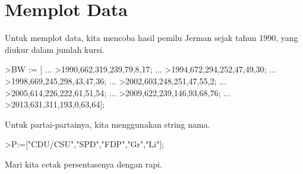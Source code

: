 \documentclass[a4paper,11pt,oneside,enabledeprecatedfontcommands]{scrbook}
\newenvironment{eulernotebook}{}{}
\newcommand{\eulerheading}[1]{\chapter{#1}}
\newenvironment{eulercomment}{\par\medskip\noindent}{\par\medskip}
\begin{document}
\begin{eulernotebook}
		\eulerheading{Memplot Data}
		\begin{eulercomment}
			Untuk memplot data, kita mencoba hasil pemilu Jerman sejak tahun 1990, yang diukur dalam jumlah
			kursi.
		\end{eulercomment}
		\begin{eulerprompt}
			>BW := [ ...
			>1990,662,319,239,79,8,17; ...
			>1994,672,294,252,47,49,30; ...
			>1998,669,245,298,43,47,36; ...
			>2002,603,248,251,47,55,2; ...
			>2005,614,226,222,61,51,54; ...
			>2009,622,239,146,93,68,76; ...
			>2013,631,311,193,0,63,64];
		\end{eulerprompt}
		\begin{eulercomment}
			Untuk partai-partainya, kita menggunakan string nama.
		\end{eulercomment}
		\begin{eulerprompt}
			>P:=["CDU/CSU","SPD","FDP","Gr","Li"];
		\end{eulerprompt}
		\begin{eulercomment}
			Mari kita cetak persentasenya dengan rapi.
			

\end{eulercomment}
\end{eulernotebook}
\end{document}
